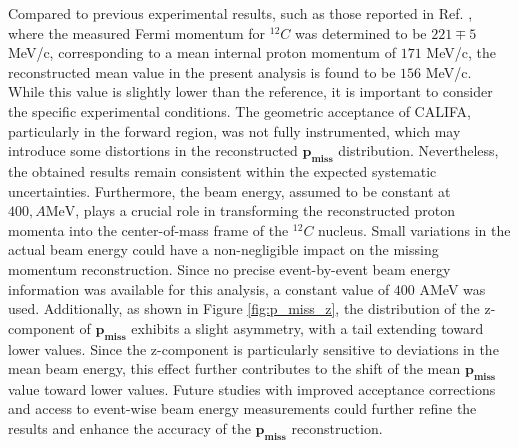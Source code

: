 Compared to previous experimental results, such as those reported in Ref. \cite{moniz1971nuclear}, where the measured Fermi momentum for $^{12}C$ was determined to be $221 \mp 5$ MeV/c, corresponding to a mean internal proton momentum of $171$ MeV/c, the reconstructed mean value in the present analysis is found to be $156$ MeV/c.\newline
While this value is slightly lower than the reference, it is important to consider the specific experimental conditions. The geometric acceptance of CALIFA, particularly in the forward region, was not fully instrumented, which may introduce some distortions in the reconstructed $\mathbf{p_{miss}}$ distribution. Nevertheless, the obtained results remain consistent within the expected systematic uncertainties.\newline
Furthermore, the beam energy, assumed to be constant at $400, A\text{MeV}$, plays a crucial role in transforming the reconstructed proton momenta into the center-of-mass frame of the $^{12}C$ nucleus. Small variations in the actual beam energy could have a non-negligible impact on the missing momentum reconstruction. Since no precise event-by-event beam energy information was available for this analysis, a constant value of $400$ AMeV was used.\newline
Additionally, as shown in Figure \ref{fig:p_miss_z}, the distribution of the z-component of $\mathbf{p_{miss}}$ exhibits a slight asymmetry, with a tail extending toward lower values. Since the z-component is particularly sensitive to deviations in the mean beam energy, this effect further contributes to the shift of the mean $\mathbf{p_{miss}}$ value toward lower values. Future studies with improved acceptance corrections and access to event-wise beam energy measurements could further refine the results and enhance the accuracy of the $\mathbf{p_{miss}}$ reconstruction.


